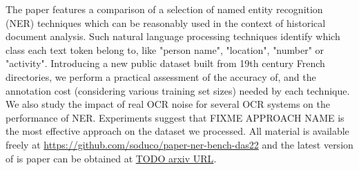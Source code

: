 The paper features a comparison of a selection of named entity recognition (NER) techniques which can be reasonably used in the context of historical document analysis.
Such natural language processing techniques identify which class each text token belong to, like "person name", "location", "number" or "activity".
Introducing a new public dataset built from 19th century French directories, 
we perform a practical assessment of the accuracy of, and the annotation cost (considering various training set sizes) needed by each technique.
We also study the impact of real OCR noise for several OCR systems on the performance of NER.
Experiments suggest that FIXME APPROACH NAME is the most effective approach on the dataset we processed.
All material is available freely at \url{https://github.com/soduco/paper-ner-bench-das22} and the latest version of is paper can be obtained at \url{TODO arxiv URL}.